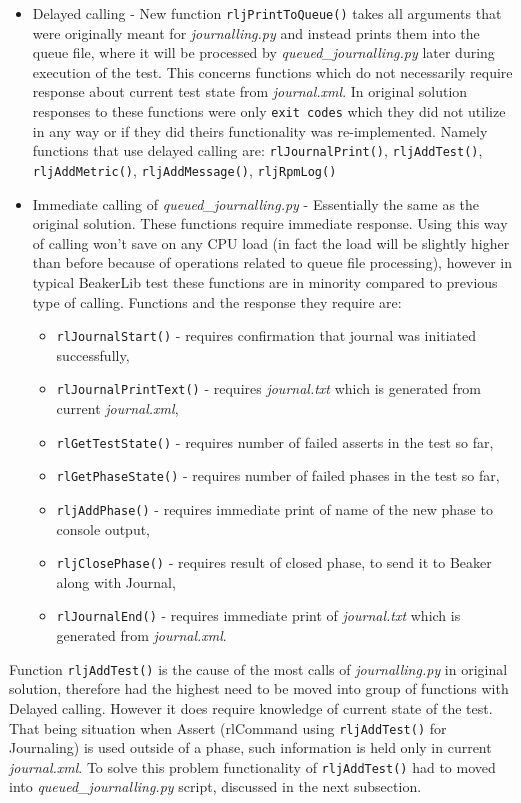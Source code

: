 \begin{itemize}
\item Delayed calling - New function \texttt{rljPrintToQueue()} takes all arguments that were originally meant for \textit{journalling.py} and instead prints them into the queue file, where it will be processed by \textit{queued\_journalling.py} later during execution of the test. This concerns functions which do not necessarily require response about current test state from \textit{journal.xml}.  In original solution responses to these functions were only \texttt{exit codes} which they did not utilize in any way or if they did theirs functionality was re-implemented. Namely functions that use delayed calling are: \texttt{rlJournalPrint()}, \texttt{rljAddTest()}, \texttt{rljAddMetric()}, \texttt{rljAddMessage()}, \texttt{rljRpmLog()}
\item Immediate calling of \textit{queued\_journalling.py} - Essentially the same as the original solution. These functions require immediate response. Using this way of calling won't save on any CPU load (in fact the load will be slightly higher than before because of operations related to queue file processing), however in typical BeakerLib test these functions are in minority compared to previous type of calling.  Functions and the response they require are:  
\begin{itemize}
\item \texttt{rlJournalStart()} - requires confirmation that journal was initiated successfully,
\item \texttt{rlJournalPrintText()} - requires \textit{journal.txt} which is generated from current \mbox{\textit{journal.xml}},
\item \texttt{rlGetTestState()}  - requires number of failed asserts in the test so far,
\item \texttt{rlGetPhaseState()} - requires number of failed phases in the test so far,
\item \texttt{rljAddPhase()} - requires immediate print of name of the new phase to console output,
\item \texttt{rljClosePhase()} - requires result of closed phase, to send it to Beaker along with Journal,
\item \texttt{rlJournalEnd()} - requires immediate print of \textit{journal.txt} which is generated from \textit{journal.xml}.
\end{itemize}
\end{itemize}

Function \texttt{rljAddTest()} is the cause of the most calls of \textit{journalling.py} in original solution, therefore had the highest need to be moved into group of functions with Delayed calling. However it does require knowledge of current state of the test. That being situation when Assert (rlCommand using \texttt{rljAddTest()} for Journaling) is used outside of a phase, such information is held only in current \textit{journal.xml}. To solve this problem functionality of  \texttt{rljAddTest()} had to moved into \textit{queued\_journalling.py} script, discussed in the next subsection.

